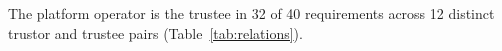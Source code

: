 The platform operator is the trustee in 32 of 40 requirements across 12 distinct trustor and trustee pairs (Table~\ref{tab:relations}).%
